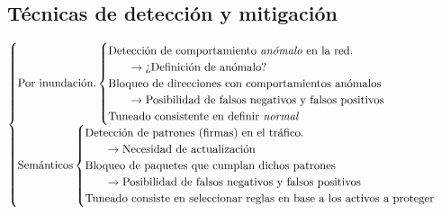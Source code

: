 \begin{Resumen}
\subsection*{Técnicas de detección y mitigación}
\begin{align*}
 \begin{cases}
   \text{Por inundación.}
   \begin{cases}
     \text{Detección de comportamiento \emph{anómalo} en la red.} \\
     \qquad\rightarrow\text{¿Definición de anómalo?} \\
     \text{Bloqueo de direcciones con comportamientos anómalos}\\
     \qquad\rightarrow\text{Posibilidad de falsos negativos y falsos positivos}\\
     \text{Tuneado consistente en definir \emph{normal}}
   \end{cases}\\
   \text{Semánticos}
   \begin{cases}
     \text{Detección de patrones (firmas) en el tráfico.} \\
     \qquad\rightarrow\text{Necesidad de actualización} \\
     \text{Bloqueo de paquetes que cumplan dichos patrones}\\
     \qquad\rightarrow\text{Posibilidad de falsos negativos y falsos positivos} \\
     \text{Tuneado consiste en seleccionar reglas en base a los activos a proteger}
   \end{cases}\\
 \end{cases}
\end{align*}

\end{Resumen}

